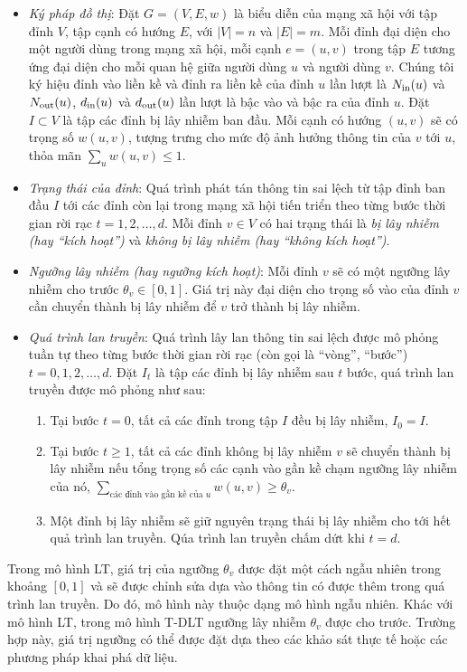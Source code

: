 \begin {itemize}
\item {\itshape Ký pháp đồ thị}: Đặt $G=(V,E,w)$ là biểu diễn của mạng xã hội với tập đỉnh $V$, tập cạnh có hướng $E$, với $|V|=n$ và $|E|=m$. Mỗi đỉnh đại diện cho một người dùng trong mạng xã hội, mỗi cạnh $e=(u,v)$ trong tập $E$ tương ứng đại diện cho mỗi quan hệ giữa người dùng $u$ và người dùng $v$. Chúng tôi ký hiệu đỉnh vào liền kề và đỉnh ra liền kề của đỉnh $u$ lần lượt là $N_{\textup{in}}(u)$ và $N_{\textup{out}}(u)$, $d_{\textup{in}}(u)$ và $d_{\textup{out}}(u)$ lần lượt là bậc vào và bậc ra của đỉnh $u$. Đặt $I \subset V$ là tập các đỉnh bị lây nhiễm ban đầu. Mỗi cạnh có hướng $(u,v)$ sẽ có trọng số $w(u,v)$, tượng trưng cho mức độ ảnh hưởng thông tin của $v$ tới $u$, thỏa mãn $\sum_{u} w(u,v) \leq 1$.

\item {\itshape Trạng thái của đỉnh}: Quá trình phát tán thông tin sai lệch từ tập đỉnh ban đầu $I$ tới các đỉnh còn lại trong mạng xã hội tiến triển theo từng bước thời gian rời rạc $t=1,2,…,d$. Mỗi đỉnh $v \in V$ có hai trạng thái là {\itshape bị lây nhiễm (hay “kích hoạt”)} và {\itshape không bị lây nhiễm (hay “không kích hoạt”)}.

\item {\itshape Ngưỡng lây nhiễm (hay ngưỡng kích hoạt)}: Mỗi đỉnh $v$ sẽ có một ngưỡng lây nhiễm cho trước $\theta_{v} \in [0,1]$. Giá trị này đại diện cho trọng số vào của đỉnh $v$ cần chuyển thành bị lây nhiễm để $v$ trở thành bị lây nhiễm.

\item {\itshape Quá trình lan truyền}: Quá trình lây lan thông tin sai lệch được mô phỏng tuần tự theo từng bước thời gian rời rạc (còn gọi là “vòng”, “bước”) $t=0,1,2,…,d$. Đặt $I_{t}$ là tập các đỉnh bị lây nhiễm sau $t$ bước, quá trình lan truyền được mô phỏng như sau:
\begin {enumerate} [+]
\item Tại bước $t=0$, tất cả các đỉnh trong tập $I$ đều bị lây nhiễm, $I_{0}=I$.

\item Tại bước $t\geq1$, tất cả các đỉnh không bị lây nhiễm $v$ sẽ chuyển thành bị lây nhiễm nếu tổng trọng số các cạnh vào gần kề chạm ngưỡng lây nhiễm của nó, $\sum_{\text{các đỉnh vào gần kề của $u$}} w(u,v) \geq \theta_{v}$.	

\item Một đỉnh bị lây nhiễm sẽ giữ nguyên trạng thái bị lây nhiễm cho tới hết quả trình lan truyền. Qúa trình lan truyền chấm dứt khi $t = d$.
\end {enumerate}
\end {itemize}
Trong mô hình LT, giá trị của ngưỡng $\theta_{v}$ được đặt một cách ngẫu nhiên trong khoảng $[0,1]$ và sẽ được chỉnh sửa dựa vào thông tin có được thêm trong quá trình lan truyền. Do đó, mô hình này thuộc dạng mô hình ngẫu nhiên. Khác với mô hình LT, trong mô hình T-DLT ngưỡng lây nhiễm $\theta_{v}$ được cho trước. Trường hợp này, giá trị ngưỡng có thể được đặt dựa theo các khảo sát thực tế hoặc các phương pháp khai phá dữ liệu.


